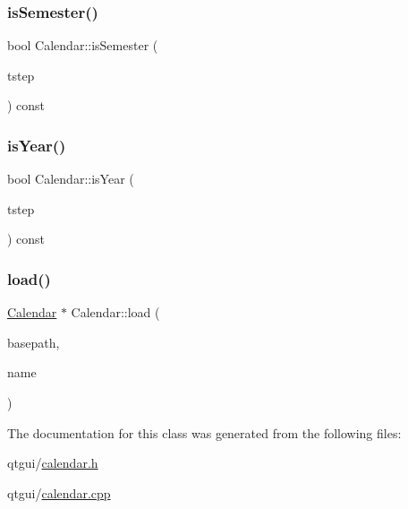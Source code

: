 \mbox{\label{class_calendar_a00bdd3de7bdf3bf73dacd58935d64f17}} 
\subsubsection{\texorpdfstring{isSemester()}{isSemester()}}
{\footnotesize\ttfamily bool Calendar\+::is\+Semester (\begin{DoxyParamCaption}\item[{int}]{tstep }\end{DoxyParamCaption}) const\hspace{0.3cm}{\ttfamily [inline]}}

\mbox{\label{class_calendar_a8fb49de65297953dfe0eb7d6b71f7071}} 
\subsubsection{\texorpdfstring{isYear()}{isYear()}}
{\footnotesize\ttfamily bool Calendar\+::is\+Year (\begin{DoxyParamCaption}\item[{int}]{tstep }\end{DoxyParamCaption}) const\hspace{0.3cm}{\ttfamily [inline]}}

\mbox{\label{class_calendar_a43a4e78d05abb54f5225defeccdeed41}} 
\subsubsection{\texorpdfstring{load()}{load()}}
{\footnotesize\ttfamily \mbox{\hyperlink{class_calendar}{Calendar}} $\ast$ Calendar\+::load (\begin{DoxyParamCaption}\item[{Q\+String}]{basepath,  }\item[{Q\+String}]{name }\end{DoxyParamCaption})\hspace{0.3cm}{\ttfamily [static]}}



The documentation for this class was generated from the following files\+:\begin{DoxyCompactItemize}
\item 
qtgui/\mbox{\hyperlink{calendar_8h}{calendar.\+h}}\item 
qtgui/\mbox{\hyperlink{calendar_8cpp}{calendar.\+cpp}}\end{DoxyCompactItemize}
